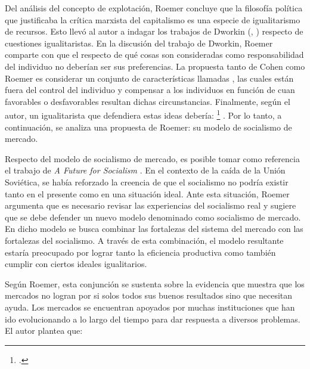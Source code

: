 Del análisis del concepto de explotación, Roemer concluye que la filosofía política que justificaba la crítica marxista del capitalismo es una especie de igualitarismo de recursos. Esto llevó al autor a indagar los trabajos de Dworkin (\citeyear{Dworkin_1981a}, \citeyear{Dworkin_1981b}) respecto de cuestiones igualitaristas. En la discusión del trabajo de Dworkin, Roemer comparte con \citet{Cohen_1989} que el  respecto de qué cosas son consideradas como responsabilidad del individuo no deberían ser sus preferencias. La propuesta tanto de Cohen como Roemer es considerar un conjunto de características llamadas , las cuales están fuera del control del individuo y compensar a los individuos en función de cuan favorables o desfavorables resultan dichas circunstancias. Finalmente, según el autor, un igualitarista que defendiera estas ideas debería: \footnote{ \citep[p. 4]{Roemer_1996b}.} \citep[p. 4]{Roemer_1996b}. Por lo tanto, a continuación, se analiza una propuesta de Roemer: su modelo de socialismo de mercado.


Respecto del modelo de socialismo de mercado, es posible tomar como referencia el trabajo de \textit{A Future for Socialism} \citep{Roemer_1994}. En el contexto de la caída de la Unión Soviética, se había reforzado la creencia de que el socialismo no podría existir tanto en el presente como en una situación ideal. Ante esta situación, Roemer argumenta que es necesario revisar las experiencias del socialismo real y sugiere que se debe defender un nuevo modelo denominado como socialismo de mercado. En dicho modelo se busca combinar las fortalezas del sistema del mercado con las fortalezas del socialismo. A través de esta combinación, el modelo resultante estaría preocupado por lograr tanto la eficiencia productiva como también cumplir con ciertos ideales igualitarios. 

Según Roemer, esta conjunción se sustenta sobre la evidencia que muestra que los mercados no logran por si solos todos sus buenos resultados sino que necesitan ayuda. Los mercados se encuentran apoyados por muchas instituciones que han ido evolucionando a lo largo del tiempo para dar respuesta a diversos problemas. El autor plantea que: 


